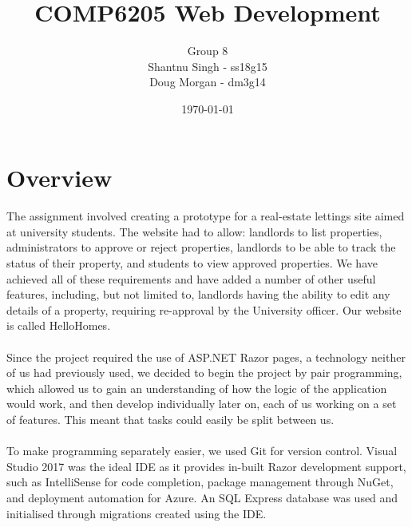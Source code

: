 \documentclass{article}
\begin{document}
\title{COMP6205 Web Development\\}
\author{Group 8\\Shantnu Singh - ss18g15\\Doug Morgan - dm3g14}
\date{\today}
\maketitle

\section{Overview}
    \paragraph{}
        The assignment involved creating a prototype for a real-estate lettings site aimed at university students.
        The website had to allow: landlords to list properties, administrators to approve or reject properties, landlords to be able to track the status of their property, and students to view approved properties.
        We have achieved all of these requirements and have added a number of other useful features, including, but not limited to, landlords having the ability to edit any details of a property, requiring re-approval by the University officer.
        Our website is called HelloHomes.

    \paragraph{}
        Since the project required the use of ASP.NET Razor pages, a technology neither of us had previously used, we decided to begin the project by pair programming, which allowed us to gain an understanding of how the logic of the application would work, and then develop individually later on, each of us working on a set of features.
        This meant that tasks could easily be split between us.

    \paragraph{}
        To make programming separately easier, we used Git for version control.
        Visual Studio 2017 was the ideal IDE as it provides in-built Razor development support, such as IntelliSense for code completion, package management through NuGet, and deployment automation for Azure.
        An SQL Express database was used and initialised through migrations created using the IDE.
\end{document}

